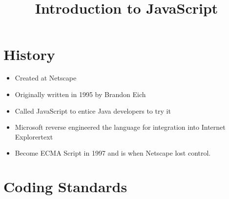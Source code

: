 \documentclass {article}
\title {Introduction to JavaScript}
\begin{document}
\maketitle

\section {History}

\begin{itemize}
	\item Created at Netscape
	\item Originally written in 1995 by Brandon Eich
	\item Called JavaScript to entice Java developers to try it
	\item Microsoft reverse engineered the language for integration into Internet Explorertext
	\item Become ECMA Script in 1997 and is when Netscape lost control. 
\end{itemize}


\section{Coding Standards}
\end{document}
